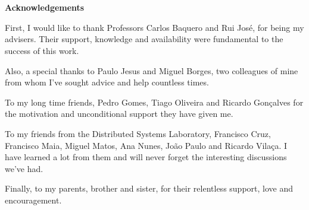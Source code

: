 \chapter*{}
\begin{center}\textbf{Acknowledgements}\end{center}

First, I would like to thank Professors Carlos Baquero and Rui José,
for being my advisers. Their support, knowledge and availability were
fundamental to the success of this work.

Also, a special thanks to Paulo Jesus and Miguel Borges, two colleagues
of mine from whom I've sought advice and help countless times.

To my long time friends, Pedro Gomes, Tiago Oliveira and Ricardo
Gonçalves for the motivation and unconditional support they have given
me.

To my friends from the
Distributed Systems Laboratory, Francisco Cruz, Francisco Maia, Miguel
Matos, Ana Nunes, João Paulo and Ricardo Vilaça. I have learned a lot
from them and will never forget the interesting discussions we've had.

Finally, to my parents, brother and sister, for their relentless
support, love and encouragement.



\thispagestyle{empty}
